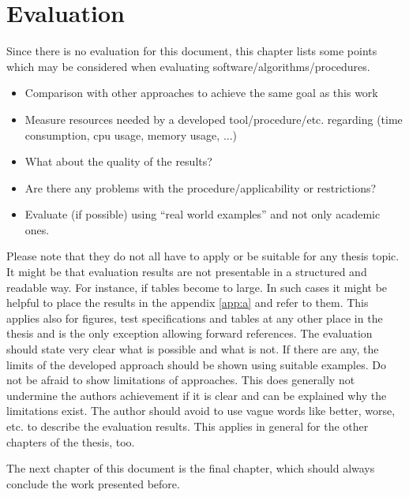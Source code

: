 
\chapter{Evaluation}
\label{sect:evaluation}

Since there is no evaluation for this document, this chapter lists some points which may be considered when evaluating software/algorithms/procedures.
\begin{itemize}
	\item Comparison with other approaches to achieve the same goal as this work
	\item Measure resources needed by a developed tool/procedure/etc. regarding (time consumption, cpu usage, memory usage, ...)
	\item What about the quality of the results?
	\item Are there any problems with the procedure/applicability or restrictions?
	\item Evaluate (if possible) using \enquote{real world examples} and not only academic ones.
\end{itemize}

Please note that they do not all have to apply or be suitable for any thesis topic.
It might be that evaluation results are not presentable in a structured and readable way.
For instance, if tables become to large.
In such cases it might be helpful to place the results in the appendix \ref{app:a} and refer to them.
This applies also for figures, test specifications and tables at any other place in the thesis and is the only exception allowing forward references.
The evaluation should state very clear what is possible and what is not.
If there are any, the limits of the developed approach should be shown using suitable examples.
Do not be afraid to show limitations of approaches.
This does generally not undermine the authors achievement if it is clear and can be explained why the limitations exist.
The author should avoid to use vague words like better, worse, etc. to describe the evaluation results.
This applies in general for the other chapters of the thesis, too.

The next chapter of this document is the final chapter, which should always conclude the work presented before.
